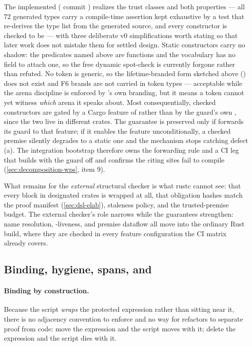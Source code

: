 The implemented  ( commit
) realizes the trust classes and both properties --- all
72 generated types carry a compile-time  assertion
kept exhaustive by a test that re-derives the type list from the
generated source, and every constructor is checked to be
 --- with three deliberate v0 simplifications
worth stating so that later work does not mistake them for settled
design. Static constructors carry no  shadow: the
predicates named above are \dotnetrs{} functions and the vocabulary has
no field to attach one, so the free dynamic spot-check is currently
forgone rather than refuted. No token is generic, so the
lifetime-branded form sketched above
() does not exist and F6 brands are not
carried in token types --- acceptable while the arena discipline is
enforced by \gcarena{}'s own branding, but it means a token cannot yet
witness \emph{which} arena it speaks about. Most consequentially,
checked constructors are gated by a Cargo feature of
 rather than by the guard's own , since the
two live in different crates. The guarantee is preserved only if
\dotnetrs{} forwards its guard  to that feature; if it
enables the feature unconditionally, a checked premise silently
degrades to a static one and the mechanism stops catching defect (a).
The integration bootstrap therefore owns the forwarding rule and a CI
leg that builds with the guard off and confirms the citing sites fail
to compile (\cref{sec:decomposition-wps}, item 9).

What remains for the \emph{external} structural checker is what rustc
cannot see: that every  block in designated crates is
wrapped at all, that obligation hashes match the proof manifest
(\cref{sec:dsl-elab}), staleness policy, and the trusted-premise
budget. The external checker's role narrows while the guarantees
strengthen: name resolution, -liveness, and premise
dataflow all move into the ordinary Rust build, where they are
checked in every feature configuration the CI matrix already covers.

\subsection{Binding, hygiene, spans, and }
\label{sec:dsl-binding}

\paragraph{Binding by construction.} Because the script \emph{wraps}
the protected expression rather than sitting near it, there is no
adjacency convention to enforce and no way for refactors to separate
proof from code: move the expression and the script moves with it;
delete the expression and the script dies with it.

